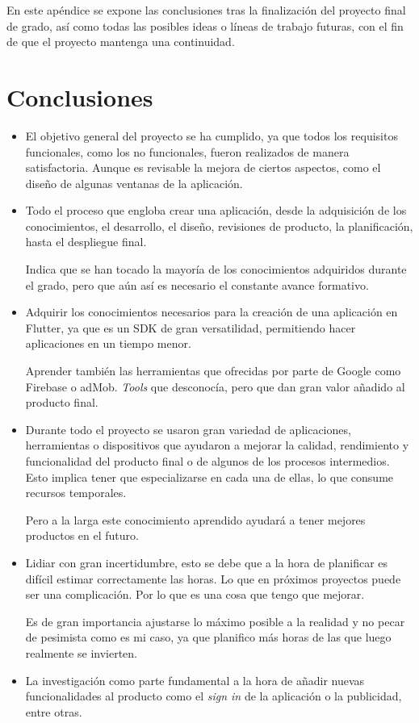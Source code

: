 
En este apéndice se expone las conclusiones tras la finalización del proyecto final de grado, así como todas las posibles ideas o líneas de trabajo futuras, con el fin de que el proyecto mantenga una continuidad.

\section{Conclusiones}

\begin{itemize}
	\item El objetivo general del proyecto se ha cumplido, ya que todos los requisitos funcionales, como los no funcionales, fueron realizados de manera satisfactoria. Aunque es revisable la mejora de ciertos aspectos, como el diseño de algunas ventanas de la aplicación.
		
	\item Todo el proceso que engloba crear una aplicación, desde la adquisición de los conocimientos, el desarrollo, el diseño, revisiones de producto, la planificación, hasta el despliegue final. 
	
	Indica que se han tocado la mayoría de los conocimientos adquiridos durante el grado, pero que aún así es necesario el constante avance formativo.
	
	\item Adquirir los conocimientos necesarios para la creación de una aplicación en Flutter, ya que es un SDK de gran versatilidad, permitiendo hacer aplicaciones en un tiempo menor.
	
	 Aprender también las herramientas que ofrecidas por parte de Google como Firebase o adMob. \emph{Tools} que desconocía, pero que dan gran valor añadido al producto final.
	
	\item Durante todo el proyecto se usaron gran variedad de aplicaciones, herramientas o dispositivos que ayudaron a mejorar la calidad, rendimiento y funcionalidad del producto final o de algunos de los procesos intermedios. Esto implica tener que especializarse en cada una de ellas, lo que consume recursos temporales.
	
	Pero a la larga este conocimiento aprendido ayudará a tener mejores productos en el futuro.
	
	\item Lidiar con gran incertidumbre, esto se debe que a la hora de planificar es difícil estimar correctamente las horas. Lo que en próximos proyectos puede ser una complicación. Por lo que es una cosa que tengo que mejorar.
	
	Es de gran importancia ajustarse lo máximo posible a la realidad y no pecar de pesimista como es mi caso, ya que planifico más horas de las que luego realmente se invierten.
	
	\item La investigación como parte fundamental a la hora de añadir nuevas funcionalidades al producto como el \emph{sign in} de la aplicación o la publicidad, entre otras.
	
\end{itemize}